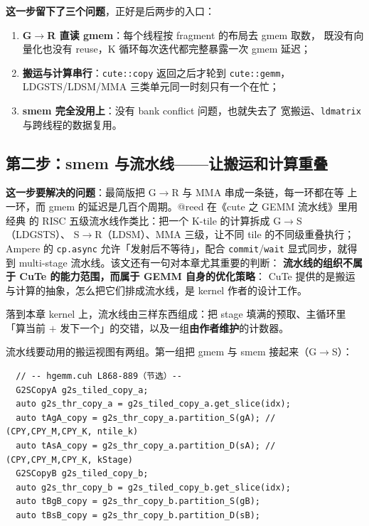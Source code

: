\textbf{这一步留下了三个问题}，正好是后两步的入口：

\begin{enumerate}
  \item \textbf{G$\to$R 直读 gmem}：每个线程按 fragment 的布局去 gmem 取数，
        既没有向量化也没有 reuse，K 循环每次迭代都完整暴露一次 gmem 延迟；
  \item \textbf{搬运与计算串行}：\texttt{cute::copy} 返回之后才轮到
        \texttt{cute::gemm}，LDGSTS/LDSM/MMA 三类单元同一时刻只有一个在忙；
  \item \textbf{smem 完全没用上}：没有 bank conflict 问题，也就失去了
        宽搬运、\texttt{ldmatrix} 与跨线程的数据复用。
\end{enumerate}

\subsection{第二步：smem 与流水线——让搬运和计算重叠}\label{sec:24-step2}

\textbf{这一步要解决的问题}：最简版把 G$\to$R 与 MMA 串成一条链，每一环都在等
上一环，而 gmem 的延迟是几百个周期。@reed 在《cute 之 GEMM 流水线》里用经典
的 RISC 五级流水线作类比：把一个 K-tile 的计算拆成 G$\to$S（LDGSTS）、
S$\to$R（LDSM）、MMA 三级，让不同 tile 的不同级重叠执行；Ampere 的
\texttt{cp.async} 允许「发射后不等待」，配合 \texttt{commit}/\texttt{wait}
显式同步，就得到 multi-stage 流水线。该文还有一句对本章尤其重要的判断：
\textbf{流水线的组织不属于 CuTe 的能力范围，而属于 GEMM 自身的优化策略}：
CuTe 提供的是搬运与计算的抽象，怎么把它们排成流水线，是 kernel 作者的设计工作。

落到本章 kernel 上，流水线由三样东西组成：把 stage 填满的预取、主循环里
「算当前 $+$ 发下一个」的交错，以及一组\textbf{由作者维护}的计数器。

流水线要动用的搬运视图有两组。第一组把 gmem 与 smem 接起来（G$\to$S）：

\begin{lstlisting}
  // -- hgemm.cuh L868-889（节选）--
  G2SCopyA g2s_tiled_copy_a;
  auto g2s_thr_copy_a = g2s_tiled_copy_a.get_slice(idx);
  auto tAgA_copy = g2s_thr_copy_a.partition_S(gA); // (CPY,CPY_M,CPY_K, ntile_k)
  auto tAsA_copy = g2s_thr_copy_a.partition_D(sA); // (CPY,CPY_M,CPY_K, kStage)
  G2SCopyB g2s_tiled_copy_b;
  auto g2s_thr_copy_b = g2s_tiled_copy_b.get_slice(idx);
  auto tBgB_copy = g2s_thr_copy_b.partition_S(gB);
  auto tBsB_copy = g2s_thr_copy_b.partition_D(sB);
\end{lstlisting}

